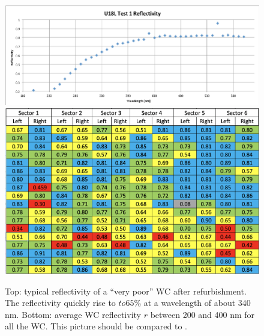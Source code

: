 \begin{figure}[h]
	\centering
	\includegraphics[width=0.95\columnwidth,keepaspectratio]{img/winstoConeSample1Reflectivity.png}
	\includegraphics[width=0.95\columnwidth,keepaspectratio]{img/wcStatusAfter.png}
	\caption{Top: typical reflectivity of a ``very poor'' WC after refurbishment.
            The reflectivity quickly rise to $to 65\%$ at a wavelength of about 340 nm. Bottom: average WC reflectivity  $r$ between 200 and 400 nm for
				all the WC. This picture should be compared to . }
	\label{fig:wcStatusAfter}
\end{figure}



